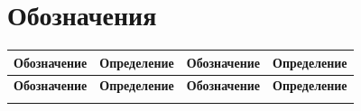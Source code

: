 \section*{Обозначения}

\begin{longtable}{|p{3cm}|p{4cm}|p{3cm}|p{4cm}|}
\hline
\textbf{Обозначение} & \textbf{Определение} & \textbf{Обозначение} & \textbf{Определение} \\
\hline
\endfirsthead

\hline
\textbf{Обозначение} & \textbf{Определение} & \textbf{Обозначение} & \textbf{Определение} \\
\hline
\endhead

\hline
\endfoot

\hline
\endlastfoot


\end{longtable}
